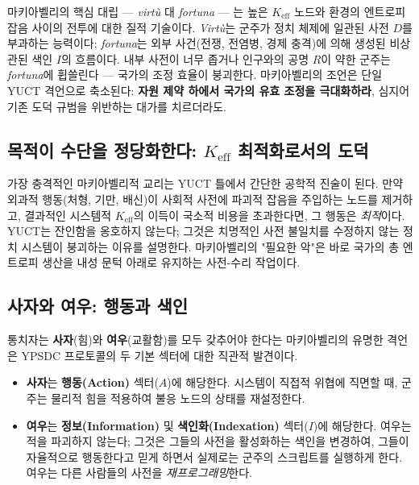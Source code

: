 \documentclass[12pt,a4paper]{article}
\begin{document}
	마키아벨리의 핵심 대립 — \emph{virtù} 대 \emph{fortuna} — 는 높은 \(K_{\mathrm{eff}}\) 노드와 환경의 엔트로피 잡음 사이의 전투에 대한 질적 기술이다. \emph{Virtù}는 군주가 정치 체제에 일관된 사전 \(D\)를 부과하는 능력이다; \emph{fortuna}는 외부 사건(전쟁, 전염병, 경제 충격)에 의해 생성된 비상관된 색인 \(I\)의 흐름이다. 내부 사전이 너무 좁거나 인구와의 공명 \(R\)이 약한 군주는 \emph{fortuna}에 휩쓸린다 — 국가의 조정 효율이 붕괴한다. 마키아벨리의 조언은 단일 YUCT 격언으로 축소된다: \textbf{자원 제약 하에서 국가의 유효 조정을 극대화하라}, 심지어 기존 도덕 규범을 위반하는 대가를 치르더라도.
	
	\subsection{목적이 수단을 정당화한다: \(K_{\mathrm{eff}}\) 최적화로서의 도덕}
	
	가장 충격적인 마키아벨리적 교리는 YUCT 틀에서 간단한 공학적 진술이 된다. 만약 외과적 행동(처형, 기만, 배신)이 사회적 사전에 파괴적 잡음을 주입하는 노드를 제거하고, 결과적인 시스템적 \(K_{\mathrm{eff}}\)의 이득이 국소적 비용을 초과한다면, 그 행동은 \emph{최적}이다. YUCT는 잔인함을 옹호하지 않는다; 그것은 치명적인 사전 불일치를 수정하지 않는 정치 시스템이 붕괴하는 이유를 설명한다. 마키아벨리의 "필요한 악"은 바로 국가의 총 엔트로피 생산을 내성 문턱 아래로 유지하는 사전-수리 작업이다.
	
	\subsection{사자와 여우: 행동과 색인}
	
	통치자는 \textbf{사자}(힘)와 \textbf{여우}(교활함)를 모두 갖추어야 한다는 마키아벨리의 유명한 격언은 YPSDC 프로토콜의 두 기본 섹터에 대한 직관적 발견이다.
	
	\begin{itemize}[leftmargin=*]
		\item \textbf{사자}는 \textbf{행동(Action)} 섹터(\(A\))에 해당한다. 시스템이 직접적 위협에 직면할 때, 군주는 물리적 힘을 적용하여 불응 노드의 상태를 재설정한다.
		\item \textbf{여우}는 \textbf{정보(Information)} 및 \textbf{색인화(Indexation)} 섹터(\(I\))에 해당한다. 여우는 적을 파괴하지 않는다; 그것은 그들의 사전을 활성화하는 색인을 변경하여, 그들이 자율적으로 행동한다고 믿게 하면서 실제로는 군주의 스크립트를 실행하게 한다. 여우는 다른 사람들의 사전을 \emph{재프로그래밍}한다.
	\end{itemize}
	
\end{document}
